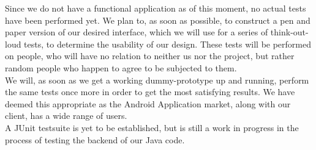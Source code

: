 \documentclass[12pt]{article}
\begin{document}
Since we do not have a functional application as of this moment, no actual tests have been performed yet. We plan to, as soon as possible, to construct a pen and paper version of our desired interface, which we will use for a series of think-out-loud tests, to determine the usability of our design. These tests will be performed on people, who will have no relation to neither us nor the project, but rather random people who happen to agree to be subjected to them.\\
We will, as soon as we get a working dummy-prototype up  and running, perform the same tests once more in order to get the most satisfying results. We have deemed this appropriate as the Android Application market, along with our client, has a wide range of users.\\
A JUnit testsuite is yet to be established, but is still a work in progress in the process of testing the backend of our Java code.
\end{document}
